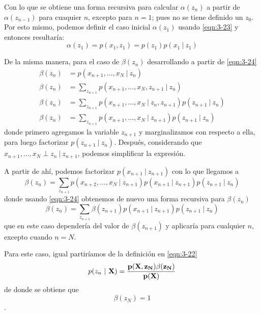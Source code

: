 Con lo que se obtiene una forma recursiva para calcular $\alpha(z_n)$ a partir de $\alpha(z_{n-1})$ para cuaquier $n$, excepto para $n = 1$; pues no se tiene definido un $z_0$. Por esto mismo, podemos definir el caso inicial $\alpha(z_1)$ usando \eqref{eqn:3-23} y entonces resultaría:
\begin{equation}
  \alpha(z_1) = p(x_1, z_1) = p(z_1) p(x_1 ~|~ z_1) 
\end{equation}

De la misma manera, para el caso de $\beta(z_n)$ desarrollando a partir de  \eqref{eqn:3-24}
\begin{align}
  \beta(z_n) &= p(x_{n+1}, ..., x_N ~|~ z_n) \\
  \beta(z_n) &= \sum_{z_{n+1}} p(x_{n+1}, ..., x_N, z_{n+1} ~|~ z_n) \\
  \beta(z_n) &= \sum_{z_{n+1}} p(x_{n+1}, ..., x_N ~|~ z_n, z_{n+1}) 
    p(z_{n+1} ~|~ z_n) \\
  \beta(z_n) &= \sum_{z_{n+1}} p(x_{n+1}, ..., x_N ~|~ z_{n+1}) 
    p(z_{n+1} ~|~ z_n)  
\end{align}
donde primero agregamos la variable $z_{n+1}$ y marginalizamos con respecto a ella, para luego factorizar $p(z_{n+1} ~|~ z_n)$. Después, considerando que 
$x_{n+1}, ..., x_N \perp z_n ~|~ z_{n+1}$, podemos simplificar la expresión.

A partir de ahí, podemos factorizar $p(x_{n+1} ~|~ z_{n+1})$ con lo que llegamos a 
\begin{equation}  
  \beta(z_n) = \sum_{z_{n+1}} p(x_{n+2}, ..., x_N ~|~ z_{n+1}) 
    p(x_{n+1} ~|~ z_{n+1}) p(z_{n+1} ~|~ z_n)    
    \label{eqn:3-27}
\end{equation}
donde usando \eqref{eqn:3-24} obtenemos de nuevo una forma recursiva para $\beta(z_n)$
\begin{equation}  
  \beta(z_n) = \sum_{z_{n+1}} \beta(z_{n+1})
    p(x_{n+1} ~|~ z_{n+1}) p(z_{n+1} ~|~ z_n)    
    \label{eqn:3-28}
\end{equation}
que en este caso dependería del valor de $\beta(z_{n+1})$ y aplicaría para cualquier $n$, excepto cuando $n = N$. 

Para este caso, igual partiríamos de la definición en \eqref{eqn:3-22}
\begin{equation}
p(z_n ~|~ \bf{X}) = \frac{p(\bf{X}, z_N) \beta(z_N)} {p(\bf{X})}
\end{equation}
de donde se obtiene que 
\begin{equation}
  \beta(z_N) = 1
\end{equation}.

